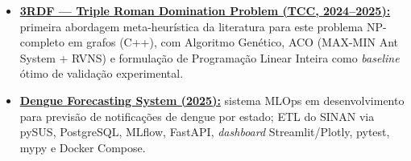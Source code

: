 \documentclass[a4paper,10pt]{article}
\begin{document}
\begin{itemize}

    \item \textbf{\href{https://github.com/isrreal/Triple-Roman-Domination-in-graphs}
    {3RDF --- Triple Roman Domination Problem (TCC, 2024--2025):}}
    primeira abordagem meta-heurística da literatura para este problema
    NP-completo em grafos (C++), com Algoritmo Genético, ACO
    (MAX-MIN Ant System + RVNS) e formulação de Programação Linear Inteira
    como \textit{baseline} ótimo de validação experimental.

    \item \textbf{\href{https://github.com/isrreal/Dengue-Forecasting-System}
    {Dengue Forecasting System (2025):}}
    sistema MLOps em desenvolvimento para previsão de notificações de dengue
    por estado; ETL do SINAN via pySUS, PostgreSQL, MLflow,
    FastAPI, \textit{dashboard} Streamlit/Plotly, pytest, mypy e
    Docker Compose.

\end{itemize}
\end{document}
